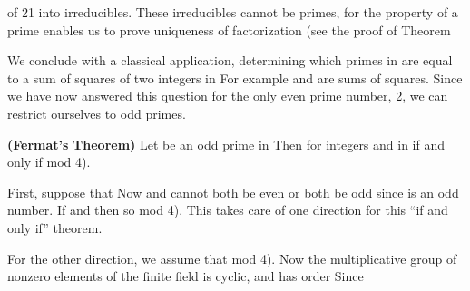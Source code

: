 \documentclass[11pt,oneside]{article}
\begin{document}
\begin{BookBody}
\noindent of 21 into irreducibles. These irreducibles cannot be primes, for the property of a prime enables us to prove uniqueness of factorization (see the proof of Theorem \BookEnd{\blacktriangle}

We conclude with a classical application, determining which primes  in  are equal to a sum of squares of two integers in  For example and  are sums of squares. Since we have now answered this question for the only even prime number, 2, we can restrict ourselves to odd primes.

 \textbf{(Fermat’s}  \textbf{Theorem)} Let  be an odd prime in  Then  for integers  and  in  if and only if mod 4).

 First, suppose that  Now  and  cannot both be even or both be odd since  is an odd number. If  and  then  so mod 4). This takes care of one direction for this “if and only if” theorem.

For the other direction, we assume that mod 4). Now the multiplicative group of nonzero elements of the finite field  is cyclic, and has order  Since

\end{BookBody}

\BookNarrativetrue
\end{document}
